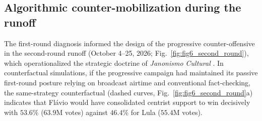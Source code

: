 \documentclass[11pt,a4paper]{article}
\begin{document}
\subsection*{Algorithmic counter-mobilization during the runoff}

The first-round diagnosis informed the design of the progressive counter-offensive in the second-round runoff (October 4--25, 2026; Fig.~\ref{fig:fig6_second_round}), which operationalized the strategic doctrine of \emph{Janonismo Cultural} \citep{janones2023janonismo}. In counterfactual simulations, if the progressive campaign had maintained its passive first-round posture relying on broadcast airtime and conventional fact-checking, the same-strategy counterfactual (dashed curves, Fig.~\ref{fig:fig6_second_round}a) indicates that Flávio would have consolidated centrist support to win decisively with $53.6\%$ ($63.9\mathrm{M}$ votes) against $46.4\%$ for Lula ($55.4\mathrm{M}$ votes).
\end{document}
